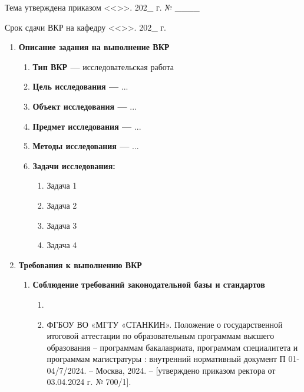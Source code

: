 \vfill

\noindent Тема утверждена приказом <<\underline{\hspace{7mm}}>>.\underline{\hspace{30mm}} 202\_ г. № \_\_\_\_

\noindent Срок сдачи ВКР на кафедру <<\underline{\hspace{7mm}}>>.\underline{\hspace{30mm}} 202\_ г.

\newpage
\fontsize{12pt}{16pt}
\selectfont
\begin{enumerate} [nosep,font=\bfseries, left=0pt] 
	\item \textbf{Описание задания на выполнение ВКР }
		\begin{enumerate} [nosep, label*=\arabic*.,font=\bfseries]
			\item \textbf{Тип ВКР ---} исследовательская работа 
			\item \textbf{Цель исследования --- } ... 
			\item \textbf{Объект исследования --- }  ... 
			\item \textbf{Предмет исследования --- } ... 
			\item \textbf{Методы исследования --- } ... 
			\item \textbf{Задачи исследования:}
				\begin{enumerate} [nosep, label*=\arabic*.]
					\item Задача 1
					\item Задача 2
					\item Задача 3
					\item Задача 4
				\end{enumerate}
		\end{enumerate}
	\item \textbf{Требования к выполнению ВКР}
		\begin{enumerate} [nosep, label*=\arabic*.,font=\bfseries]
			
			\item \textbf{Соблюдение требований законодательной базы и стандартов}%
				\begin{enumerate} [nosep, label*=\arabic*.]
					
					\item \vkrDegreeProgramDocument
						
					
					\item ФГБОУ ВО «МГТУ «СТАНКИН». Положение о государственной итоговой аттестации по образовательным программам высшего образования – программам бакалавриата, программам специалитета и программам магистратуры : внутренний нормативный документ П 01-04/7/2024. – Москва, 2024. – [утверждено приказом ректора от 03.04.2024 г. № 700/1].   
					

\end{enumerate}
\end{enumerate}
\end{enumerate}
